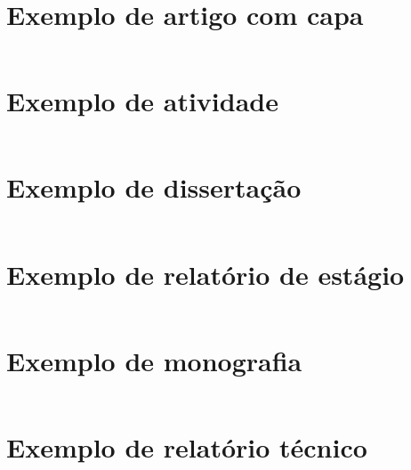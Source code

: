 \documentclass[artigo]{iftex2024}
\begin{document}
\newpage
\section{Exemplo de artigo com capa} \label{ap:exemplo_artigo_capa}

\inputminted[linenos]{latex}{exemplos/exemplo_artigo_capa.tex}

\newpage
\section{Exemplo de atividade} \label{ap:exemplo_atividade}

\inputminted[linenos]{latex}{exemplos/exemplo_atividade.tex}

\newpage
\section{Exemplo de dissertação} \label{ap:exemplo_dissertacao}

\inputminted[linenos]{latex}{exemplos/exemplo_dissertacao.tex}

\newpage
\section{Exemplo de relatório de estágio} \label{ap:exemplo_estagio}

\inputminted[linenos]{latex}{exemplos/exemplo_relatorio_estagio.tex}

\newpage
\section{Exemplo de monografia} \label{ap:exemplo_monografia}

\inputminted[linenos]{latex}{exemplos/exemplo_monografia.tex}

\newpage
\section{Exemplo de relatório técnico} \label{ap:exemplo_relatorio_tecnico}

\inputminted[linenos]{latex}{exemplos/exemplo_relatorio_tecnico.tex}
\end{document}
